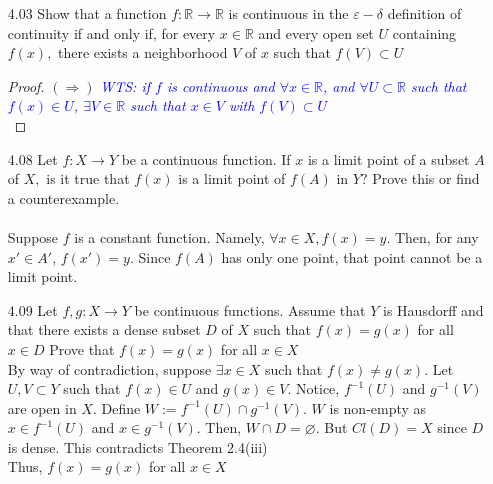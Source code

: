 \documentclass[12pt]{article}
\newcommand{\R}{\mathbb{R}}
\newcommand{\wts}[1]{\textit{\textcolor{blue}{WTS: #1}}\\}
\newcommand{\1}{^{-1}}
\begin{document}
\begin{enumerate}
\begin{proof}
		$(\Leftarrow)$ \wts{if $ f\1(C) $ is closed in $ X $ for ever closed set $ C\subset Y $, then $ f: X \rightarrow Y $ is continuous.}
		Assume $ f\1(C) $ is closed in $ X $ for every closed set $ C\subset Y $. Define $ V := Y-C $ and note that $ V\in Y $ and is open in $ Y $. Observe,
			\begin{align*}
				 f\1(V) &= f\1(Y-C)\\
						&= f\1(Y) - f\1(C)\\
						&= X - f\1(C)
			\end{align*}
		So, $ f\1(C) $ is closed in $ X $. Then, $ X-f\1(C) $ is open in $ X $.\\
		Thus, $ f $ is continuous.\\
		\\
		Therefore, a function $f: X \rightarrow Y$ is continuous if and only if $f^{-1}(C)$ is closed in $X$ for every closed set $C \subset Y$
		\end{proof}
	
	\item[4.03] Show that a function $f: \mathbb{R} \rightarrow \mathbb{R}$ is continuous in the $\varepsilon-\delta$ definition of continuity if and only if, for every $x \in \mathbb{R}$ and every open set $U$ containing $f(x),$ there exists a neighborhood $V$ of $x$ such that $f(V) \subset U$\\
	
	\begin{proof}
		$ (\Rightarrow) $ \wts{if $ f $ is continuous and $ \forall x\in\R $, and $ \forall U \subset \R $ such that $ f(x)\in U $, $ \exists V\in \R $ such that $ x\in V $ with $ f(V)\subset U $ }
	\end{proof}
	
	\item[4.08] Let $f: X \rightarrow Y$ be a continuous function. If $x$ is a limit point of a subset $A$ of $X,$ is it true that $f(x)$ is a limit point of $f(A)$ in $Y ?$ Prove this or find a counterexample.\\
	\\
	Suppose $ f $ is a constant function. Namely, $ \forall x\in X , f(x)=y$. Then, for any $ x'\in A' $, $ f(x')=y $. Since $ f(A) $ has only one point, that point cannot be a limit point. 
	\item[4.09] Let $f, g: X \rightarrow Y$ be continuous functions. Assume that $Y$ is Hausdorff and that there exists a dense subset $D$ of $X$ such that $f(x)=g(x)$ for all $x \in D$ Prove that $f(x)=g(x)$ for all $x \in X$\\
	By way of contradiction, suppose $ \exists x\in X $ such that $ f(x)\not = g(x) $. Let $ U,V\subset Y $ such that $ f(x)\in U $ and $ g(x) \in V$. Notice, $ f\1(U) $ and $ g\1(V) $ are open in $ X $. Define $ W := f\1(U)\cap g\1(V) $. $ W $ is non-empty as $ x\in f\1(U) $ and $x\in g\1(V)$. Then, $ W\cap D = \varnothing $. But $ Cl(D)=X $ since $ D $ is dense. This contradicts Theorem 2.4(iii)\\
	Thus, $ f(x) = g(x) $ for all $ x\in X $
	

\end{enumerate}
\end{document}
